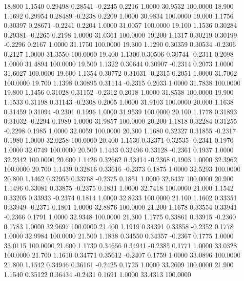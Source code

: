   18.800   1.1540   0.29498   0.28541  -0.2245   0.2216   1.0000  30.9532 100.0000
  18.900   1.1692   0.29954   0.28489  -0.2238   0.2209   1.0000  30.9834 100.0000
  19.000   1.1756   0.30397   0.28671  -0.2241   0.2204   1.0000  31.0057 100.0000
  19.100   1.1536   0.30284   0.29381  -0.2265   0.2198   1.0000  31.0361 100.0000
  19.200   1.1317   0.30219   0.30199  -0.2296   0.2167   1.0000  31.1750 100.0000
  19.300   1.1290   0.30359   0.30534  -0.2306   0.2127   1.0000  31.3550 100.0000
  19.400   1.1300   0.30506   0.30744  -0.2311   0.2098   1.0000  31.4894 100.0000
  19.500   1.1322   0.30644   0.30907  -0.2314   0.2073   1.0000  31.6027 100.0000
  19.600   1.1354   0.30772   0.31031  -0.2315   0.2051   1.0000  31.7002 100.0000
  19.700   1.1398   0.30895   0.31114  -0.2315   0.2033   1.0000  31.7838 100.0000
  19.800   1.1456   0.31028   0.31152  -0.2312   0.2018   1.0000  31.8538 100.0000
  19.900   1.1533   0.31198   0.31143  -0.2308   0.2005   1.0000  31.9103 100.0000
  20.000   1.1638   0.31459   0.31094  -0.2301   0.1996   1.0000  31.9539 100.0000
  20.100   1.1778   0.31893   0.31032  -0.2294   0.1989   1.0000  31.9857 100.0000
  20.200   1.1818   0.32284   0.31255  -0.2298   0.1985   1.0000  32.0059 100.0000
  20.300   1.1680   0.32327   0.31855  -0.2317   0.1980   1.0000  32.0258 100.0000
  20.400   1.1530   0.32371   0.32535  -0.2341   0.1970   1.0000  32.0749 100.0000
  20.500   1.1433   0.32496   0.33128  -0.2361   0.1937   1.0000  32.2342 100.0000
  20.600   1.1426   0.32662   0.33414  -0.2368   0.1903   1.0000  32.3962 100.0000
  20.700   1.1439   0.32816   0.33616  -0.2373   0.1875   1.0000  32.5293 100.0000
  20.800   1.1462   0.32955   0.33768  -0.2375   0.1851   1.0000  32.6437 100.0000
  20.900   1.1496   0.33081   0.33875  -0.2375   0.1831   1.0000  32.7418 100.0000
  21.000   1.1542   0.33205   0.33933  -0.2374   0.1814   1.0000  32.8233 100.0000
  21.100   1.1602   0.33351   0.33949  -0.2371   0.1801   1.0000  32.8876 100.0000
  21.200   1.1678   0.33554   0.33941  -0.2366   0.1791   1.0000  32.9348 100.0000
  21.300   1.1775   0.33861   0.33915  -0.2360   0.1783   1.0000  32.9697 100.0000
  21.400   1.1919   0.34391   0.33858  -0.2352   0.1778   1.0000  32.9984 100.0000
  21.500   1.1838   0.34550   0.34357  -0.2367   0.1775   1.0000  33.0115 100.0000
  21.600   1.1730   0.34656   0.34941  -0.2385   0.1771   1.0000  33.0328 100.0000
  21.700   1.1610   0.34771   0.35612  -0.2407   0.1759   1.0000  33.0896 100.0000
  21.800   1.1542   0.34946   0.36161  -0.2425   0.1725   1.0000  33.2609 100.0000
  21.900   1.1540   0.35122   0.36434  -0.2431   0.1691   1.0000  33.4313 100.0000
